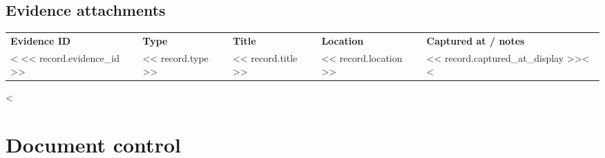 \documentclass[11pt]{article}
\begin{document}
\subsection{Evidence attachments}
\small
{}
\noindent\begin{xltabular}{\textwidth}{@{}L{1.5cm}L{1.7cm}L{2.6cm}Y L{3.2cm}@{}}
\textbf{Evidence ID} & \textbf{Type} & \textbf{Title} & \textbf{Location} & \textbf{Captured at / notes} \\
<%
<< record.evidence_id >> & << record.type >> & << record.title >> & << record.location >> & << record.captured_at_display >><%
<%
\end{xltabular}
\normalsize
<%

\clearpage
\section*{Document control}
\RDMetaTable
\end{document}
